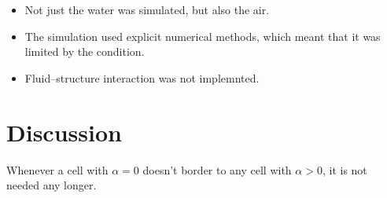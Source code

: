 \begin{itemize}
\end{itemize}

\HRule

\begin{itemize}
    \item Not just the water was simulated, but also the air. %
    
    \item The simulation used explicit numerical methods, which meant that it was limited by the \CFL condition. %
    
    \item Fluid--structure interaction was not implemnted. %
\end{itemize}


\HRule

\chapter{Discussion}

Whenever a cell with $\alpha = 0$ doesn't border to any cell with $\alpha > 0$, it is not needed any longer.


